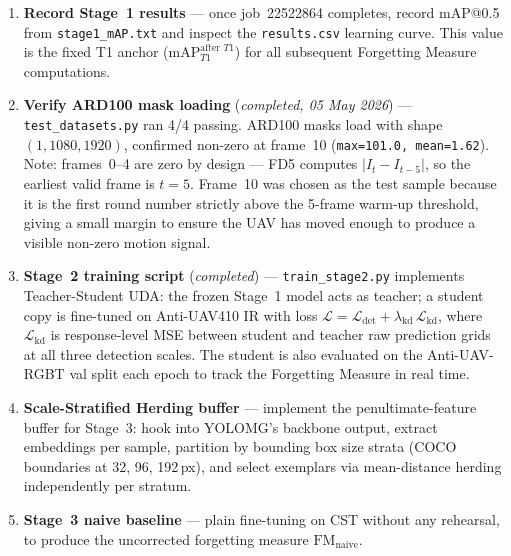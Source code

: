 \begin{enumerate}
    \item \textbf{Record Stage~1 results} — once job~22522864 completes,
          record mAP@0.5 from \texttt{stage1\_mAP.txt}
          and inspect the \texttt{results.csv} learning curve.
          This value is the fixed T1 anchor
          ($\text{mAP}_{T1}^{\text{after }T1}$) for all subsequent
          Forgetting Measure computations.
    \item \textbf{Verify ARD100 mask loading} (\textit{completed,
          05 May 2026}) — \texttt{test\_datasets.py} ran 4/4 passing.
          ARD100 masks load with shape $(1, 1080, 1920)$, confirmed
          non-zero at frame~10 (\texttt{max=101.0, mean=1.62}).
          Note: frames~0--4 are zero by design — FD5 computes
          $|I_t - I_{t-5}|$, so the earliest valid frame is $t=5$.
          Frame~10 was chosen as the test sample because it is the
          first round number strictly above the 5-frame warm-up
          threshold, giving a small margin to ensure the UAV has
          moved enough to produce a visible non-zero motion signal.
    \item \textbf{Stage~2 training script} (\textit{completed}) —
          \texttt{train\_stage2.py} implements Teacher-Student UDA:
          the frozen Stage~1 model acts as teacher; a student copy is
          fine-tuned on Anti-UAV410 IR with loss
          $\mathcal{L} = \mathcal{L}_{\text{det}} +
          \lambda_{\text{kd}}\,\mathcal{L}_{\text{kd}}$, where
          $\mathcal{L}_{\text{kd}}$ is response-level MSE between
          student and teacher raw prediction grids at all three
          detection scales. The student is also evaluated on the
          Anti-UAV-RGBT val split each epoch to track the Forgetting
          Measure in real time.
    \item \textbf{Scale-Stratified Herding buffer} — implement the
          penultimate-feature buffer for Stage~3: hook into
          YOLOMG's backbone output, extract embeddings per
          sample, partition by bounding box size strata
          (COCO boundaries at 32, 96, 192\,px), and select
          exemplars via mean-distance herding independently per
          stratum.
    \item \textbf{Stage~3 naive baseline} — plain fine-tuning on
          CST without any rehearsal, to produce the uncorrected
          forgetting measure $\text{FM}_{\text{naive}}$.
\end{enumerate}

